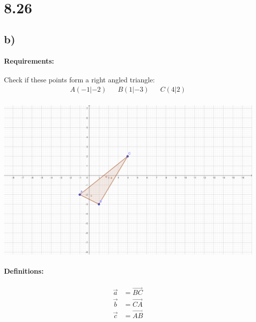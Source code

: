 \section{8.26}
\subsection{b)}
\paragraph{Requirements:}
Check if these points form a right angled triangle:
\begin{align*}
    A(-1|-2) &&
    B(1|-3) &&
    C(4|2) \\[20pt]
\end{align*}

\includegraphics[width=\linewidth]{images/8-26-b.png}

\paragraph{Definitions:}
\begin{align*}
    \vec{a} &= \vec{BC} \\
    \vec{b} &= \vec{CA} \\
    \vec{c} &= \vec{AB} \\
\end{align*}

